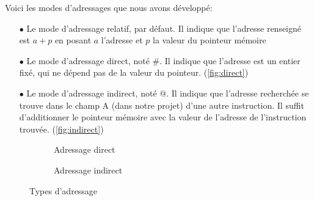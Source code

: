 \documentclass[hidelinks]{report}
\begin{document}
Voici les modes d'adressages que nous avons développé:

\begin{itemize}
    \item[$\bullet$] Le mode d'adressage relatif, par défaut. Il indique que l'adresse renseigné est $a+p$ en posant $a$ l'adresse et $p$ la valeur du pointeur mémoire
    \item[$\bullet$] Le mode d'adressage direct, noté \#. Il indique que l'adresse est un entier fixé, qui ne dépend pas de la valeur du pointeur. (\autoref{fig:direct})
    \item[$\bullet$] Le mode d'adressage indirect, noté @. Il indique que l'adresse recherchée se trouve dans le champ A (dans notre projet) d'une autre instruction. Il suffit d'additionner le pointeur mémoire avec la valeur de l'adresse de l'instruction trouvée. (\autoref{fig:indirect})
\end{itemize}
\begin{figure}[h]
\centering
    \begin{subfigure}[b]{0.4\linewidth}
      
\caption{Adressage direct}
\label{fig:direct}
\end{subfigure}
\begin{subfigure}[b]{0.4\linewidth}
\caption{Adressage indirect}
\label{fig:indirect}
\end{subfigure}
\caption{Types d'adressage}
\end{figure}
\end{document}
